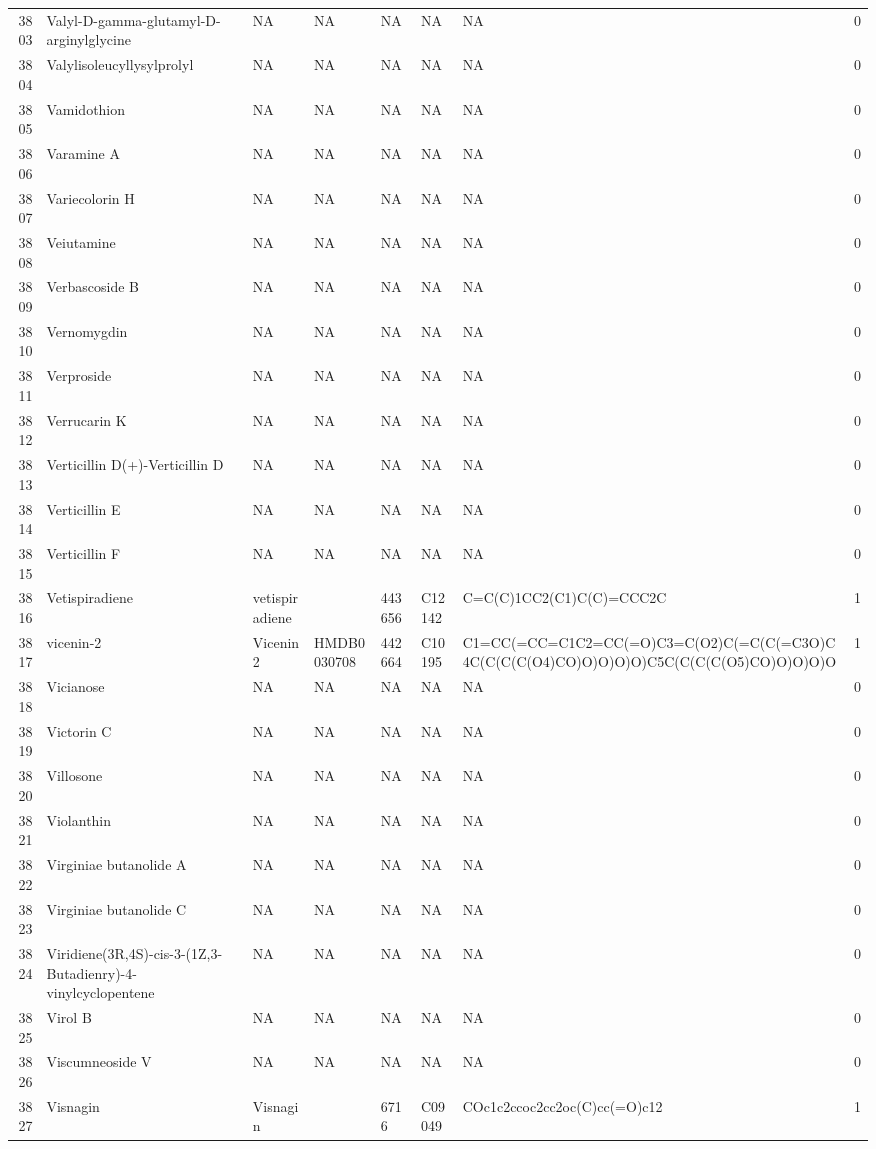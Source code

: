 \documentclass[a4paper]{article}
\begin{document}
\begin{longtable}{rlllllll}
  3803 & Valyl-D-gamma-glutamyl-D-arginylglycine & NA & NA & NA & NA & NA & 0 \\ 
  3804 & Valylisoleucyllysylprolyl & NA & NA & NA & NA & NA & 0 \\ 
  3805 & Vamidothion & NA & NA & NA & NA & NA & 0 \\ 
  3806 & Varamine A & NA & NA & NA & NA & NA & 0 \\ 
  3807 & Variecolorin H & NA & NA & NA & NA & NA & 0 \\ 
  3808 & Veiutamine & NA & NA & NA & NA & NA & 0 \\ 
  3809 & Verbascoside B & NA & NA & NA & NA & NA & 0 \\ 
  3810 & Vernomygdin & NA & NA & NA & NA & NA & 0 \\ 
  3811 & Verproside & NA & NA & NA & NA & NA & 0 \\ 
  3812 & Verrucarin K & NA & NA & NA & NA & NA & 0 \\ 
  3813 & Verticillin D(+)-Verticillin D & NA & NA & NA & NA & NA & 0 \\ 
  3814 & Verticillin E & NA & NA & NA & NA & NA & 0 \\ 
  3815 & Verticillin F & NA & NA & NA & NA & NA & 0 \\ 
  3816 & Vetispiradiene & vetispiradiene &  & 443656 & C12142 & C=C(C)1CC2(C1)C(C)=CCC2C & 1 \\ 
  3817 & vicenin-2 & Vicenin 2 & HMDB0030708 & 442664 & C10195 & C1=CC(=CC=C1C2=CC(=O)C3=C(O2)C(=C(C(=C3O)C4C(C(C(C(O4)CO)O)O)O)O)C5C(C(C(C(O5)CO)O)O)O)O & 1 \\ 
  3818 & Vicianose & NA & NA & NA & NA & NA & 0 \\ 
  3819 & Victorin C & NA & NA & NA & NA & NA & 0 \\ 
  3820 & Villosone & NA & NA & NA & NA & NA & 0 \\ 
  3821 & Violanthin & NA & NA & NA & NA & NA & 0 \\ 
  3822 & Virginiae butanolide A & NA & NA & NA & NA & NA & 0 \\ 
  3823 & Virginiae butanolide C & NA & NA & NA & NA & NA & 0 \\ 
  3824 & Viridiene(3R,4S)-cis-3-(1Z,3-Butadienry)-4-vinylcyclopentene & NA & NA & NA & NA & NA & 0 \\ 
  3825 & Virol B & NA & NA & NA & NA & NA & 0 \\ 
  3826 & Viscumneoside V & NA & NA & NA & NA & NA & 0 \\ 
  3827 & Visnagin & Visnagin &  & 6716 & C09049 & COc1c2ccoc2cc2oc(C)cc(=O)c12 & 1 \\ 

\end{longtable}
\end{document}
